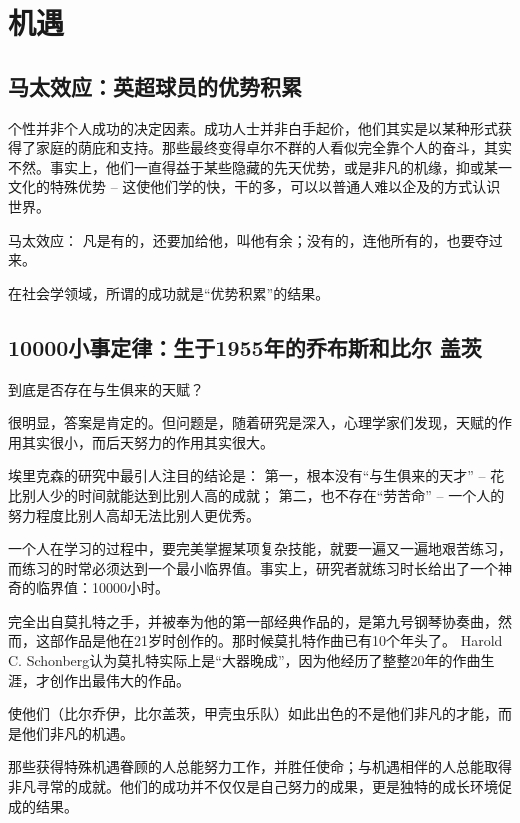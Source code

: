 \documentclass{ctexbook}
\begin{document}

\frontmatter


\tableofcontents
\mainmatter

\part{机遇}

\chapter{马太效应：英超球员的优势积累}

个性并非个人成功的决定因素。成功人士并非白手起价，他们其实是以某种形式获得了家庭的荫庇和支持。那些最终变得卓尔不群的人看似完全靠个人的奋斗，其实不然。事实上，他们一直得益于某些隐藏的先天优势，或是非凡的机缘，抑或某一文化的特殊优势 -- 这使他们学的快，干的多，可以以普通人难以企及的方式认识世界。

马太效应： 凡是有的，还要加给他，叫他有余；没有的，连他所有的，也要夺过来。

在社会学领域，所谓的成功就是“优势积累”的结果。


\chapter{10000小事定律：生于1955年的乔布斯和比尔 盖茨}

到底是否存在与生俱来的天赋？

很明显，答案是肯定的。但问题是，随着研究是深入，心理学家们发现，天赋的作用其实很小，而后天努力的作用其实很大。


埃里克森的研究中最引人注目的结论是：
第一，根本没有“与生俱来的天才” -- 花比别人少的时间就能达到比别人高的成就；
第二，也不存在“劳苦命” -- 一个人的努力程度比别人高却无法比别人更优秀。


一个人在学习的过程中，要完美掌握某项复杂技能，就要一遍又一遍地艰苦练习，而练习的时常必须达到一个最小临界值。事实上，研究者就练习时长给出了一个神奇的临界值：10000小时。

完全出自莫扎特之手，并被奉为他的第一部经典作品的，是第九号钢琴协奏曲，然而，这部作品是他在21岁时创作的。那时候莫扎特作曲已有10个年头了。
Harold C. Schonberg认为莫扎特实际上是“大器晚成”，因为他经历了整整20年的作曲生涯，才创作出最伟大的作品。


使他们（比尔乔伊，比尔盖茨，甲壳虫乐队）如此出色的不是他们非凡的才能，而是他们非凡的机遇。

那些获得特殊机遇眷顾的人总能努力工作，并胜任使命；与机遇相伴的人总能取得非凡寻常的成就。他们的成功并不仅仅是自己努力的成果，更是独特的成长环境促成的结果。
\end{document}
